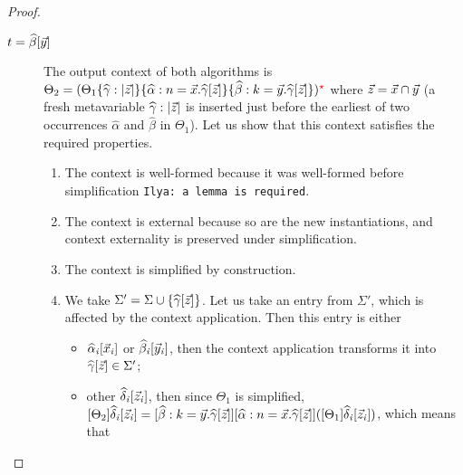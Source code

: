 \documentclass[a4,natbib=false]{article}
\newcommand{\ilyam}[1]{{\color{red} \texttt{Ilya:  #1}}}
\begin{document}
\begin{proof}
\begin{description}
  \item[$t = \widehat{\beta}  [  \vec{y}  ]$] 
    The output context of both algorithms is
    $\Theta_{{\mathrm{2}}} =  (  \Theta_{{\mathrm{1}}}  \{  \widehat{\gamma}  :  \mbox{$\mid$}  \vec{z}  \mbox{$\mid$}  \}  \{  \widehat{\alpha}  :  n  =  \vec{x}  .  \widehat{\gamma}  [  \vec{z}  ]  \}  \{  \widehat{\beta}  :  k  =  \vec{y}  .  \widehat{\gamma}  [  \vec{z}  ]  \}  ) ^{\color{red}\star} $ where
    $\vec{z}  =  \vec{x}  \cap  \vec{y}$ (a fresh metavariable $\widehat{\gamma}  :  \mbox{$\mid$}  \vec{z}  \mbox{$\mid$}$ is inserted just before 
    the earliest of two occurrences $\widehat{\alpha}$ and $\widehat{\beta}$ in $\Theta_{{\mathrm{1}}}$).
    Let us show that this context satisfies the required properties.
    \begin{enumerate}
      \item The context is well-formed because it was well-formed before
        simplification \ilyam{a lemma is required}.
      \item The context is external because so are the new instantiations, and
        context externality is preserved under simplification.
      \item The context is simplified by construction.
      \item We take $\Sigma' = \Sigma \cup \{ \widehat{\gamma}  [  \vec{z}  ] \}$.
        Let us take an entry from $\Sigma'$, which is affected by the context application.
        Then this entry is either 
        \begin{itemize}
        \item $\widehat{\alpha}_{\mathit{i}}  [  \vec{x}_{\mathit{i}}  ]$ or $\widehat{\beta}_{\mathit{i}}  [  \vec{y}_{\mathit{i}}  ]$, then the context application
          transforms it into $\widehat{\gamma}  [  \vec{z}  ] \in \Sigma'$;
        \item other $\widehat{\delta}_{\mathit{i}}  [  \vec{z}_{\mathit{i}}  ]$, then since $\Theta_{{\mathrm{1}}}$ is simplified,
          $[  \Theta_{{\mathrm{2}}}  ]  \widehat{\delta}_{\mathit{i}}  [  \vec{z}_{\mathit{i}}  ] = [  \widehat{\beta}  :  k  =  \vec{y}  .  \widehat{\gamma}  [  \vec{z}  ]  ]  [  \widehat{\alpha}  :  n  =  \vec{x}  .  \widehat{\gamma}  [  \vec{z}  ]  ]  (  [  \Theta_{{\mathrm{1}}}  ]  \widehat{\delta}_{\mathit{i}}  [  \vec{z}_{\mathit{i}}  ]  )$, which means that

\end{itemize}
\end{enumerate}
\end{description}
\end{proof}
\end{document}

